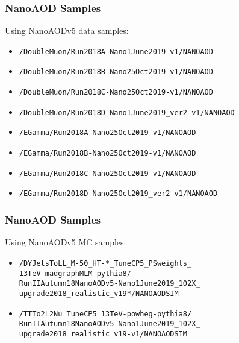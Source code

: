 \documentclass{beamer}
\begin{document}
\begin{frame}
  \frametitle{NanoAOD Samples}

  Using NanoAODv5 data samples:

  \begin{itemize}
  \item \texttt{\small /DoubleMuon/Run2018A-Nano1June2019-v1/NANOAOD}
  \item \texttt{\small /DoubleMuon/Run2018B-Nano25Oct2019-v1/NANOAOD}
  \item \texttt{\small /DoubleMuon/Run2018C-Nano25Oct2019-v1/NANOAOD}
  \item \texttt{\small /DoubleMuon/Run2018D-Nano1June2019\_ver2-v1/NANOAOD}
  \item \texttt{\small /EGamma/Run2018A-Nano25Oct2019-v1/NANOAOD}
  \item \texttt{\small /EGamma/Run2018B-Nano25Oct2019-v1/NANOAOD}
  \item \texttt{\small /EGamma/Run2018C-Nano25Oct2019-v1/NANOAOD}
  \item \texttt{\small /EGamma/Run2018D-Nano25Oct2019\_ver2-v1/NANOAOD}
  \end{itemize}

\end{frame}


\begin{frame}
  \frametitle{NanoAOD Samples}

  Using NanoAODv5 MC samples:

  \begin{itemize}
  \item \texttt{\small /DYJetsToLL\_M-50\_HT-*\_TuneCP5\_PSweights\_\\13TeV-madgraphMLM-pythia8/\\RunIIAutumn18NanoAODv5-Nano1June2019\_102X\_\\upgrade2018\_realistic\_v19*/NANOAODSIM}
  \item \texttt{\small /TTTo2L2Nu\_TuneCP5\_13TeV-powheg-pythia8/\\RunIIAutumn18NanoAODv5-Nano1June2019\_102X\_\\upgrade2018\_realistic\_v19-v1/NANOAODSIM}
  \end{itemize}

\end{frame}
\end{document}
